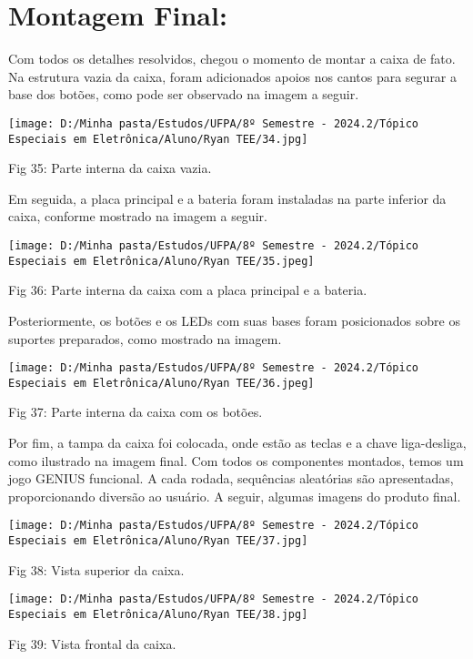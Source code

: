 \documentclass[
]{book}
\begin{document}
\section{Montagem Final:}\label{montagem-final}

Com todos os detalhes resolvidos, chegou o momento de montar a caixa de fato. Na estrutura vazia da caixa, foram adicionados apoios nos cantos para segurar a base dos botões, como pode ser observado na imagem a seguir.

\texttt{[image: D:/Minha pasta/Estudos/UFPA/8º Semestre - 2024.2/Tópico Especiais em Eletrônica/Aluno/Ryan TEE/34.jpg]}

Fig 35: Parte interna da caixa vazia.

Em seguida, a placa principal e a bateria foram instaladas na parte inferior da caixa, conforme mostrado na imagem a seguir.

\texttt{[image: D:/Minha pasta/Estudos/UFPA/8º Semestre - 2024.2/Tópico Especiais em Eletrônica/Aluno/Ryan TEE/35.jpeg]}

Fig 36: Parte interna da caixa com a placa principal e a bateria.

Posteriormente, os botões e os LEDs com suas bases foram posicionados sobre os suportes preparados, como mostrado na imagem.

\texttt{[image: D:/Minha pasta/Estudos/UFPA/8º Semestre - 2024.2/Tópico Especiais em Eletrônica/Aluno/Ryan TEE/36.jpeg]}

Fig 37: Parte interna da caixa com os botões.

Por fim, a tampa da caixa foi colocada, onde estão as teclas e a chave liga-desliga, como ilustrado na imagem final. Com todos os componentes montados, temos um jogo GENIUS funcional. A cada rodada, sequências aleatórias são apresentadas, proporcionando diversão ao usuário. A seguir, algumas imagens do produto final.

\texttt{[image: D:/Minha pasta/Estudos/UFPA/8º Semestre - 2024.2/Tópico Especiais em Eletrônica/Aluno/Ryan TEE/37.jpg]}

Fig 38: Vista superior da caixa.

\texttt{[image: D:/Minha pasta/Estudos/UFPA/8º Semestre - 2024.2/Tópico Especiais em Eletrônica/Aluno/Ryan TEE/38.jpg]}

Fig 39: Vista frontal da caixa.
\end{document}

